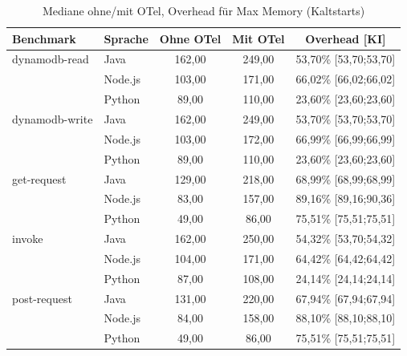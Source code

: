 \begin{table}[H]
\centering
\footnotesize
\caption{Mediane ohne/mit OTel, Overhead  für Max Memory (Kaltstarts)}
\label{app:boot-abs-memory-cold}
\begin{tabular}{|l|l|c|c|c|}
\hline
\textbf{Benchmark} & \textbf{Sprache} & \textbf{Ohne OTel} & \textbf{Mit OTel} & \textbf{Overhead [KI]} \\
\hline
dynamodb-read   & Java    & 162,00 & 249,00 & 53,70\% [53,70;53,70] \\
                & Node.js & 103,00 & 171,00 & 66,02\% [66,02;66,02] \\
                & Python  &  89,00 & 110,00 & 23,60\% [23,60;23,60] \\
\hline
dynamodb-write  & Java    & 162,00 & 249,00 & 53,70\% [53,70;53,70] \\
                & Node.js & 103,00 & 172,00 & 66,99\% [66,99;66,99] \\
                & Python  &  89,00 & 110,00 & 23,60\% [23,60;23,60] \\
\hline
get-request     & Java    & 129,00 & 218,00 & 68,99\% [68,99;68,99] \\
                & Node.js &  83,00 & 157,00 & 89,16\% [89,16;90,36] \\
                & Python  &  49,00 &  86,00 & 75,51\% [75,51;75,51] \\
\hline
invoke          & Java    & 162,00 & 250,00 & 54,32\% [53,70;54,32] \\
                & Node.js & 104,00 & 171,00 & 64,42\% [64,42;64,42] \\
                & Python  &  87,00 & 108,00 & 24,14\% [24,14;24,14] \\
\hline
post-request    & Java    & 131,00 & 220,00 & 67,94\% [67,94;67,94] \\
                & Node.js &  84,00 & 158,00 & 88,10\% [88,10;88,10] \\
                & Python  &  49,00 &  86,00 & 75,51\% [75,51;75,51] \\
\hline
\end{tabular}
\end{table}

